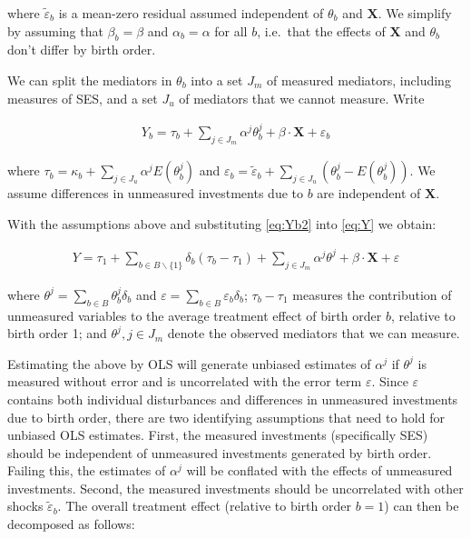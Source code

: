 \documentclass[
]{article}
\begin{document}
where \(\tilde{\varepsilon}_b\) is a mean-zero residual assumed
independent of \(\theta_b\) and \(\mathbf{X}\). We simplify by assuming that
\(\beta_b = \beta\) and \(\alpha_b = \alpha\) for all \(b\), i.e.~that the
effects of \(\mathbf{X}\) and \(\theta_b\) don't differ by birth order.

We can split the mediators in \(\theta_b\) into a set \(J_m\) of measured
mediators, including measures of SES, and a set \(J_u\) of mediators that
we cannot measure. Write

\begin{align}
\label{eq:Yb2}
Y_b = \tau_b + \sum_{j \in J_m} \alpha^j \theta^j_b + \beta \cdot \mathbf{X} + \varepsilon_b
\end{align}

where \(\tau_b = \kappa_b + \sum_{j \in J_u} \alpha^j E(\theta^j_b)\) and
\(\varepsilon_b = \tilde{\varepsilon}_b + \sum_{j \in J_u} (\theta^j_b - E(\theta^j_b))\).
We assume differences in unmeasured investments due to \(b\) are
independent of \(\mathbf{X}\).

With the assumptions above and substituting \eqref{eq:Yb2} into
\eqref{eq:Y} we obtain:

\begin{align}
\label{eq:Ynew}
Y = \tau_1+\sum_{b \in B\backslash\{1\}} \delta_b(\tau_b-\tau_1) + \sum_{j \in J_m} \alpha^j \theta^j  +   \beta \cdot \mathbf{X} + \varepsilon
\end{align}

where \(\theta^j = \sum_{b \in B}\theta^j_b\delta_b\) and
\(\varepsilon = \sum_{b \in B}\varepsilon_b\delta_b\); \(\tau_b-\tau_1\)
measures the contribution of unmeasured variables to the average
treatment effect of birth order \(b\), relative to birth order 1; and
\(\theta^j, j \in J_m\) denote the observed mediators that we can measure.

Estimating the above by OLS will generate unbiased estimates of
\(\alpha^j\) if \(\theta^j\) is measured without error and is uncorrelated
with the error term \(\varepsilon\). Since \(\varepsilon\) contains both
individual disturbances and differences in unmeasured investments due to
birth order, there are two identifying assumptions that need to hold for unbiased
OLS estimates. First, the measured investments (specifically SES) should
be independent of unmeasured investments generated by birth order.
Failing this, the estimates of \(\alpha^j\) will be conflated with the
effects of unmeasured investments. Second, the measured investments should
be uncorrelated with other shocks \(\tilde{\varepsilon}_b\). The overall
treatment effect (relative to birth order \(b = 1\)) can then be
decomposed as follows:
\end{document}
